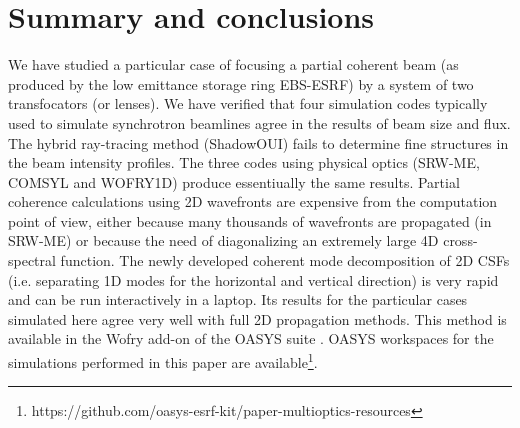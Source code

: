 \documentclass{iucr}              %
\begin{document}


\section{Summary and conclusions}
\label{sec:summary}


We have studied a particular case of focusing a partial coherent beam (as produced by the low emittance storage ring EBS-ESRF) by a system of two transfocators (or lenses). We have verified that four simulation codes typically used to simulate synchrotron beamlines agree in the results of beam size and flux. The hybrid ray-tracing method (ShadowOUI) fails to determine fine structures in the beam intensity profiles. The three codes using physical optics (SRW-ME, COMSYL and WOFRY1D) produce essentiually the same results. Partial coherence calculations using 2D wavefronts are expensive from the computation point of view, either because many thousands of wavefronts are propagated (in SRW-ME) or because the need of diagonalizing an extremely large 4D cross-spectral function. The newly developed coherent mode decomposition of 2D CSFs (i.e. separating 1D modes for the horizontal and vertical direction) is very rapid and can be run interactively in a laptop. Its results for the particular cases simulated here agree very well with full 2D propagation methods. 
This method is available in the Wofry add-on of the OASYS suite \cite{codeOASYS}. OASYS workspaces for the simulations performed in this paper are available\footnote{{ https://github.com/oasys-esrf-kit/paper-multioptics-resources}}.
\end{document}
